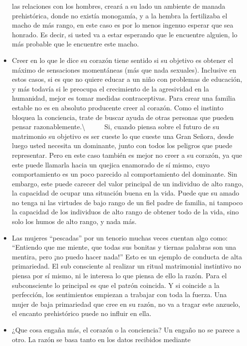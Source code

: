 \begin{itemize}
  las relaciones con los hombres, creará a su lado un ambiente de manada
  prehistórica, donde no existía monogamía, y a la hembra la fertilizaba
  el macho de más rango, en este caso es por lo menos ingenuo esperar
  que sea honrado. Es decir, si usted va a estar esperando que le
  encuentre alguien, lo más probable que le encuentre este macho.
\item
  Creer en lo que le dice su corazón tiene sentido si su objetivo es
  obtener el máximo de sensaciones momentáneas (más que nada sexuales).
  Inclusive en estos casos, si es que no quiere educar a un niño con
  problemas de educación, y más todavía si le preocupa el crecimiento de
  la agresividad en la humanidad, mejor es tomar medidas contraceptivas.
  Para crear una familia estable no es en absoluto producente creer al
  corazón. Como el instinto bloquea la conciencia, trate de buscar ayuda
  de otras personas que pueden pensar razonablemente.\textbackslash{} ~
  ~ ~ Si, cuando piensa sobre el futuro de su matrimonio su objetivo es
  ser cueste lo que cueste una Gran Señora, desde luego usted necesita
  un dominante, junto con todos los peligros que puede representar. Pero
  en este caso también es mejor no creer a su corazón, ya que este puede
  llamarla hacia un quejica enamorado de sí mismo, cuyo comportamiento
  es un poco parecido al comportamiento del dominante. Sin embargo, este
  puede carecer del valor principal de un individuo de alto rango, la
  capacidad de ocupar una situación buena en la vida. Puede que su amado
  no tenga ni las virtudes de bajo rango de un fiel padre de familia, ni
  tampoco la capacidad de los individuos de alto rango de obtener todo
  de la vida, sino solo los humos de alto rango, y nada más.
\item
  Las mujeres ``pescadas'' por un tenorio muchas veces cuentan algo
  como: ``Entiendo que me miente, que todas sus bonitas y tiernas
  palabras son una mentira, pero ¡no puedo hacer nada!'' Esto es un
  ejemplo de conducta de alta primariedad. El sub consciente al realizar
  un ritual matrimonial instintivo no piensa por sí mismo, ni le
  interesa lo que piensa de ello la razón. Para el subconsciente lo
  principal es que el patrón coincida. Y si coincide a la perfección,
  los sentimientos empiezan a trabajar con toda la fuerza. Una mujer de
  baja primariedad que cree en su razón, no va a tragar este anzuelo, el
  encanto prehistórico puede no influir en ella.
\item
  ¿Que cosa engaña más, el corazón o la conciencia? Un engaño no se
  parece a otro. La razón se basa tanto en los datos recibidos mediante

\end{itemize}

